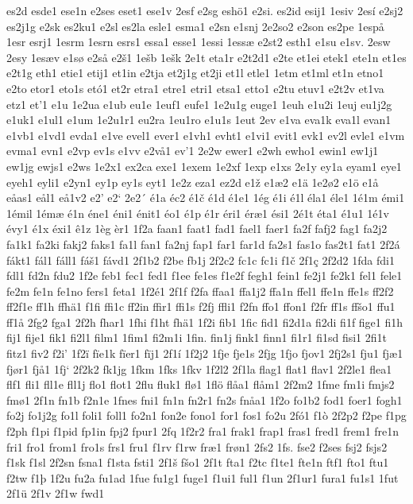 es2d
esde1
ese1n
e2ses
eset1
ese1v
2esf
e2sg
eshö1
e2si.
es2id
esij1
1esiv
2esí
e2sj2
es2j1g
e2sk
es2ku1
e2sl
es2la
esle1
esma1
e2sn
e1snj
2e2so2
e2son
es2pe
1espå
1esr
esrj1
1esrm
1esrn
esrs1
essa1
esse1
1essi
1essæ
e2st2
esth1
e1su
e1sv.
2esw
2esy
1esæv
e1sø
e2så
e2š1
1ešb
1ešk
2e1t
eta1r
e2t2d1
e2te
et1ei
etek1
ete1n
et1es
e2t1g
eth1
etie1
etij1
et1in
e2tja
et2j1g
et2ji
et1l
etle1
1etm
et1ml
et1n
etno1
e2to
etor1
eto1s
etó1
et2r
etra1
etre1
etri1
etsa1
etto1
e2tu
etuv1
e2t2v
et1va
etz1
et'1
e1u
1e2ua
e1ub
eu1e
1euf1
eufe1
1e2u1g
euge1
1euh
e1u2i
1euj
eu1j2g
e1uk1
e1ul1
e1um
1e2u1r1
eu2ra
1eu1ro
e1u1s
1eut
2ev
e1va
eva1k
eva1l
evan1
e1vb1
e1vd1
evda1
e1ve
evel1
ever1
e1vh1
evht1
e1vi1
evit1
evk1
ev2l
evle1
e1vm
evma1
evn1
e2vp
ev1s
e1vv
e2vå1
ev'1
2e2w
ewer1
e2wh
ewho1
ewin1
ew1j1
ew1jg
ewjs1
e2ws
1e2x1
ex2ca
exe1
1exem
1e2xf
1exp
e1xs
2e1y
ey1a
eyam1
eye1
eyeh1
eyli1
e2yn1
ey1p
ey1s
eyt1
1e2z
eza1
ez2d
e1ž
e1æ2
e1ä
1e2ø2
e1ö
e1å
eåas1
eål1
eå1v2
e2'
e2`
2e2´
é1a
éc2
é1č
é1d
é1e1
1ég
é1i
é1l
éla1
éle1
1é1m
émi1
1émil
1émæ
é1n
éne1
éni1
énit1
éo1
é1p
é1r
éri1
éræ1
ési1
2é1t
éta1
é1u1
1é1v
évy1
é1x
éxi1
ê1z
1èg
èr1
1f2a
faan1
faat1
fad1
fael1
faer1
fa2f
fafj2
fag1
fa2j2
fa1k1
fa2ki
fakj2
faks1
fa1l
fan1
fa2nj
fap1
far1
far1d
fa2s1
fas1o
fas2t1
fat1
2f2á
fákt1
fál1
fáll1
fáš1
fávd1
2f1b2
f2be
fb1j
2f2c2
fc1c
fc1i
f1č
2f1ç
2f2d2
1fda
fdi1
fdl1
fd2n
fdu2
1f2e
feb1
fec1
fed1
f1ee
fe1es
f1e2f
fegh1
fein1
fe2j1
fe2k1
fel1
fele1
fe2m
fe1n
fe1no
fers1
feta1
1f2é1
2f1f
f2fa
ffaa1
ffa1j2
ffa1n
ffel1
ffe1n
ffe1s
ff2f2
ff2f1e
ff1h
ffhä1
f1fi
ffi1c
ff2in
ffir1
ffi1s
f2fj
ffli1
f2fn
ffo1
ffon1
f2fr
ff1s
ffšo1
ffu1
ff1å
2fg2
fga1
2f2h
fhar1
1fhi
f1ht
fhä1
1f2i
fib1
1fic
fid1
fi2d1a
fi2di
fi1f
fige1
fi1h
fij1
fije1
fik1
fi2l1
film1
1fim1
fi2m1i
1fin.
fin1j
fink1
finn1
fi1r1
fi1sd
fisi1
2fi1t
fitz1
fiv2
f2i'
1f2ï
fïe1k
fïer1
fïj1
2f1í
1f2j2
1fje
fje1s
2fjg
1fjo
fjov1
2fj2s1
fju1
fjæ1
fjør1
fjå1
1fj`
2f2k2
fk1jg
1fkm
1fks
1fkv
1f2l2
2f1la
flag1
flat1
flav1
2f2le1
flea1
flf1
fli1
fll1e
fll1j
flo1
flot1
2flu
fluk1
flø1
1flö
flåa1
flåm1
2f2m2
1fme
fm1i
fmjs2
fmø1
2f1n
fn1b
f2n1e
1fnes
fni1
fn1n
fn2r1
fn2s
fnåa1
1f2o
fo1b2
fod1
foer1
fogh1
fo2j
fo1j2g
fo1l
foli1
foll1
fo2n1
fon2e
fono1
for1
fos1
fo2u
2fó1
f1ò
2f2p2
f2pe
f1pg
f2ph
f1pi
f1pid
fp1in
fpj2
fpur1
2fq
1f2r2
fra1
frak1
frap1
fras1
fred1
frem1
fre1n
fri1
fro1
from1
fro1s
frs1
fru1
f1rv
f1rw
fræ1
frøn1
2fs2
1fs.
fse2
f2ses
fsj2
fsjs2
f1sk
f1sl
2f2sn
fsna1
f1sta
fsti1
2f1š
fšo1
2f1t
fta1
f2tc
f1te1
fte1n
ftf1
fto1
ftu1
f2tw
f1þ
1f2u
fu2a
fu1ad
1fue
fu1g1
fuge1
f1ui1
ful1
f1un
2f1ur1
fura1
fu1s1
1fut
2f1ü
2f1v
2f1w
fwd1
